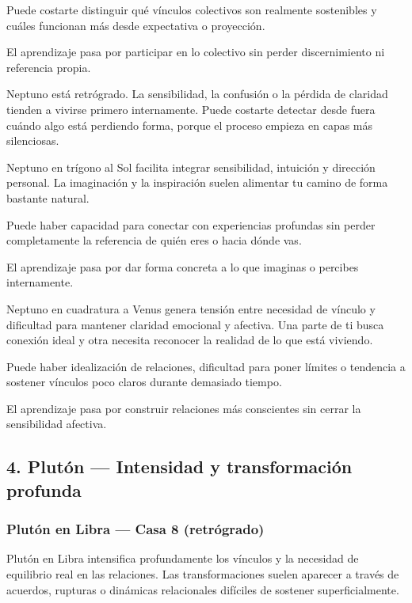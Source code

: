 \documentclass[11pt,a4paper]{article}
\begin{document}
Puede costarte distinguir qué vínculos colectivos son realmente sostenibles y cuáles funcionan más desde expectativa o proyección.

El aprendizaje pasa por participar en lo colectivo sin perder discernimiento ni referencia propia.

Neptuno está retrógrado. La sensibilidad, la confusión o la pérdida de claridad tienden a vivirse primero internamente. Puede costarte detectar desde fuera cuándo algo está perdiendo forma, porque el proceso empieza en capas más silenciosas.

Neptuno en trígono al Sol facilita integrar sensibilidad, intuición y dirección personal. La imaginación y la inspiración suelen alimentar tu camino de forma bastante natural.

Puede haber capacidad para conectar con experiencias profundas sin perder completamente la referencia de quién eres o hacia dónde vas.

El aprendizaje pasa por dar forma concreta a lo que imaginas o percibes internamente.

Neptuno en cuadratura a Venus genera tensión entre necesidad de vínculo y dificultad para mantener claridad emocional y afectiva. Una parte de ti busca conexión ideal y otra necesita reconocer la realidad de lo que está viviendo.

Puede haber idealización de relaciones, dificultad para poner límites o tendencia a sostener vínculos poco claros durante demasiado tiempo.

El aprendizaje pasa por construir relaciones más conscientes sin cerrar la sensibilidad afectiva.

\vspace{0.8cm}

\subsection{4. Plutón — Intensidad y transformación profunda}

\subsubsection*{Plutón en Libra — Casa 8 (retrógrado)}

Plutón en Libra intensifica profundamente los vínculos y la necesidad de equilibrio real en las relaciones. Las transformaciones suelen aparecer a través de acuerdos, rupturas o dinámicas relacionales difíciles de sostener superficialmente.
\end{document}
